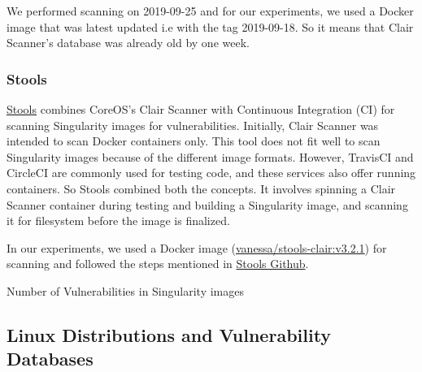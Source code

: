 \documentclass[a4paper,num-refs]{oup-contemporary}
\begin{document}
We performed scanning on 2019-09-25 and for our experiments, we used a Docker image that was 
latest updated i.e with the tag 2019-09-18. So it means that Clair Scanner's database was already
old by one week.

\subsubsection{Stools}

\href{https://github.com/singularityhub/stools}{Stools} combines CoreOS's Clair Scanner with Continuous Integration (CI)
for scanning Singularity images for vulnerabilities.
Initially, Clair Scanner was intended to scan Docker containers only. This tool does not fit well
to scan Singularity images because of the different image formats.
However, TravisCI and CircleCI are commonly used for testing code, and these
services also offer running containers. So Stools combined both the concepts.
It involves spinning a Clair Scanner container during testing and building a
Singularity image, and scanning it for filesystem before the image is finalized.

In our experiments, we used a Docker image (\href{https://hub.docker.com/r/vanessa/stools-clair}{vanessa/stools-clair:v3.2.1})
for scanning and followed the steps mentioned in \href{https://github.com/singularityhub/stools}{Stools Github}.

\begin{table}
%
       \centering
        \caption{\label{sing}Number of Vulnerabilities in Singularity images}
\end{table}

\subsection{Linux Distributions and Vulnerability Databases}
\end{document}
